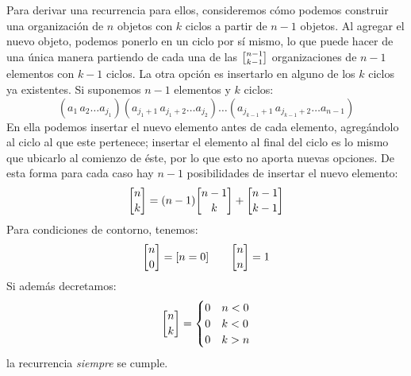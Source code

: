   Para derivar una recurrencia para ellos,%
  consideremos cómo podemos construir
  una organización de \(n\) objetos con \(k\) ciclos
  a partir de \(n - 1\) objetos.
  Al agregar el nuevo objeto,
  podemos ponerlo en un ciclo por sí mismo,
  lo que puede hacer de una única manera
  partiendo
  de cada una de las \(\cycle{n - 1}{k - 1}\) organizaciones
  de \(n - 1\) elementos con \(k - 1\) ciclos.
  La otra opción
  es insertarlo en alguno de los \(k\) ciclos ya existentes.
  Si suponemos \(n - 1\) elementos y \(k\) ciclos:
  \begin{equation*}
    (a_1 \, a_2 \dotso a_{j_1})
    (a_{j_1 + 1} \, a_{j_1 + 2} \dotso a_{j_2})
    \dotso
    (a_{j_{k - 1} + 1} \, a_{j_{k - 1} + 2} \dotso a_{n - 1})
  \end{equation*}
  En ella podemos insertar el nuevo elemento antes de cada elemento,
  agregándolo al ciclo al que este pertenece;
  insertar el elemento al final del ciclo
  es lo mismo que ubicarlo al comienzo de éste,
  por lo que esto no aporta nuevas opciones.
  De esta forma para cada caso
  hay \(n - 1\) posibilidades de insertar el nuevo elemento:
  \begin{equation}
    \label{eq:recurrence-Stirling-1}
    \cycle{n}{k}
      = (n - 1) \cycle{n - 1}{k} + \cycle{n - 1}{k - 1}
  \end{equation}
  Para condiciones de contorno,
  tenemos:
  \begin{equation*}
    \cycle{n}{0}
      = [n = 0]
    \qquad
    \cycle{n}{n}
      = 1
  \end{equation*}
  Si además decretamos:
  \begin{equation*}
    \cycle{n}{k} =
      \begin{cases}
	0 & n < 0 \\
	0 & k < 0 \\
	0 & k > n
      \end{cases}
  \end{equation*}
  la recurrencia \emph{siempre} se cumple.

